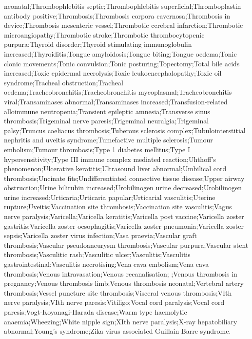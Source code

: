 \begin{refsection}
\begin{tcolorbox}[quote]
neonatal;Thrombophlebitis septic;Thrombophlebitis superficial;Thromboplastin antibody positive;Thrombosis;Thrombosis corpora cavernosa;Thrombosis in device;Thrombosis mesenteric vessel;Thrombotic cerebral infarction;Thrombotic microangiopathy;Thrombotic stroke;Thrombotic thrombocytopenic purpura;Thyroid disorder;Thyroid stimulating immunoglobulin increased;Thyroiditis;Tongue amyloidosis;Tongue biting;Tongue oedema;Tonic clonic movements;Tonic convulsion;Tonic posturing;Topectomy;Total bile acids increased;Toxic epidermal necrolysis;Toxic leukoencephalopathy;Toxic oil syndrome;Tracheal obstruction;Tracheal oedema;Tracheobronchitis;Tracheobronchitis mycoplasmal;Tracheobronchitis viral;Transaminases abnormal;Transaminases increased;Transfusion-related alloimmune neutropenia;Transient epileptic amnesia;Transverse sinus thrombosis;Trigeminal nerve paresis;Trigeminal neuralgia;Trigeminal palsy;Truncus coeliacus thrombosis;Tuberous sclerosis complex;Tubulointerstitial nephritis and uveitis syndrome;Tumefactive multiple sclerosis;Tumour embolism;Tumour thrombosis;Type 1 diabetes mellitus;Type I hypersensitivity;Type III immune complex mediated reaction;Uhthoff's phenomenon;Ulcerative keratitis;Ultrasound liver abnormal;Umbilical cord thrombosis;Uncinate fits;Undifferentiated connective tissue disease;Upper airway obstruction;Urine bilirubin increased;Urobilinogen urine decreased;Urobilinogen urine increased;Urticaria;Urticaria papular;Urticarial vasculitis;Uterine rupture;Uveitis;Vaccination site thrombosis;Vaccination site vasculitis;Vagus nerve paralysis;Varicella;Varicella keratitis;Varicella post vaccine;Varicella zoster gastritis;Varicella zoster oesophagitis;Varicella zoster pneumonia;Varicella zoster sepsis;Varicella zoster virus infection;Vasa praevia;Vascular graft thrombosis;Vascular pseudoaneurysm thrombosis;Vascular purpura;Vascular stent thrombosis;Vasculitic rash;Vasculitic ulcer;Vasculitis;Vasculitis gastrointestinal;Vasculitis necrotising;Vena cava embolism;Vena cava thrombosis;Venous intravasation;Venous recanalisation; ;Venous thrombosis in pregnancy;Venous thrombosis limb;Venous thrombosis neonatal;Vertebral artery thrombosis;Vessel puncture site thrombosis;Visceral venous thrombosis;VIth nerve paralysis;VIth nerve paresis;Vitiligo;Vocal cord paralysis;Vocal cord paresis;Vogt-Koyanagi-Harada disease;Warm type haemolytic anaemia;Wheezing;White nipple sign;XIth nerve paralysis;X-ray hepatobiliary abnormal;Young's syndrome;Zika virus associated Guillain Barre syndrome.\textsuperscript{\cite{url129837g3}}

\end{tcolorbox}

\printbibliography[heading=subbibliography]

\end{refsection}